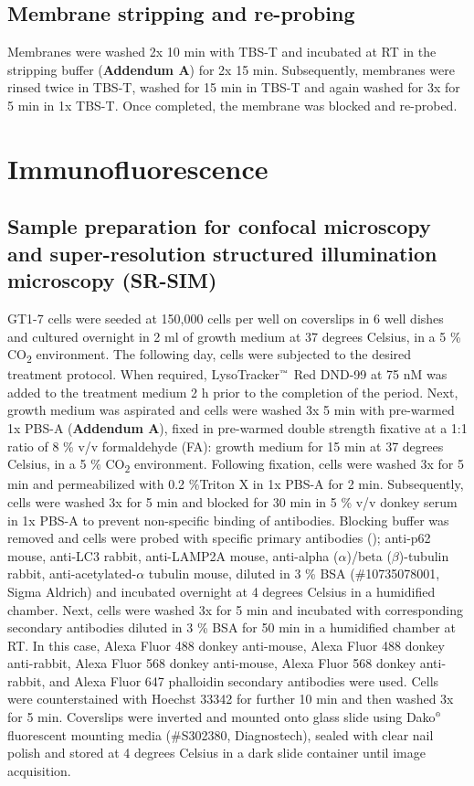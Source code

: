 \subsection{Membrane stripping and re-probing}
Membranes were washed 2x 10 min with TBS-T and incubated at RT in the stripping buffer (\textbf{Addendum A}) for 2x 15 min. Subsequently, membranes were rinsed twice in TBS-T, washed for 15 min in TBS-T and again washed for 3x for 5 min in 1x TBS-T. Once completed, the membrane was blocked and re-probed.

\section{Immunofluorescence}
\subsection{Sample preparation for confocal microscopy and super-resolution structured illumination microscopy (SR-SIM)}
GT1-7 cells were seeded at 150,000 cells per well on coverslips in 6 well dishes and cultured overnight in 2 ml of growth medium at 37 degrees Celsius, in a 5 \% CO\textsubscript{2} environment. The following day, cells were subjected to the desired treatment protocol. When required, LysoTracker${\textsuperscript{\tiny{\texttrademark}}}$ Red DND-99 at 75 nM was added to the treatment medium 2 h prior to the completion of the period. Next, growth medium was aspirated and cells were washed 3x 5 min with pre-warmed  1x PBS-A (\textbf{Addendum A}), fixed in pre-warmed double strength fixative at a 1:1 ratio of 8 \% v/v formaldehyde (FA): growth medium for 15 min at 37 degrees Celsius, in a 5 \% CO\textsubscript{2} environment. Following fixation, cells were washed 3x for 5 min and permeabilized with 0.2 \%Triton X in 1x PBS-A for 2 min. Subsequently, cells were washed 3x for 5 min and blocked for 30 min in 5 \% v/v donkey serum in 1x PBS-A to prevent non-specific binding of antibodies. Blocking buffer was removed and cells were probed with specific primary antibodies (); anti-p62 mouse, anti-LC3 rabbit, anti-LAMP2A mouse, anti-alpha ($\alpha$)/beta ($\beta$)-tubulin rabbit, anti-acetylated-$\alpha$ tubulin mouse, diluted in 3 \% BSA (\#10735078001, Sigma Aldrich) and incubated overnight at 4 degrees Celsius in a humidified chamber. Next, cells were washed 3x for 5 min and incubated with corresponding secondary antibodies diluted in 3 \% BSA for 50 min in a humidified chamber at RT. In this case, Alexa Fluor 488 donkey anti-mouse, Alexa Fluor 488 donkey anti-rabbit, Alexa Fluor 568 donkey anti-mouse, Alexa Fluor 568 donkey anti-rabbit, and Alexa Fluor 647 phalloidin secondary antibodies were used. Cells were counterstained with Hoechst 33342 for further 10 min and then washed 3x for 5 min. Coverslips were inverted and mounted onto glass slide using Dako${\textsuperscript{\tiny{\textregistered}}}$ fluorescent mounting media (\#S302380, Diagnostech), sealed with clear nail polish and stored at 4 degrees Celsius in a dark slide container until image acquisition.

